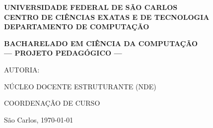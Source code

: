 \begin{titlepage}
\thispagestyle{empty}

\begin{center}

\begin{figure}[!ht]
    \hfill
  \end{figure}
  
   
    
   {\Large \textbf{UNIVERSIDADE FEDERAL DE SÃO CARLOS}} \\
   {\Large \textbf{CENTRO DE CIÊNCIAS EXATAS E DE TECNOLOGIA}} \\ 
   {\Large \textbf{DEPARTAMENTO DE COMPUTAÇÃO}}  \\ 
    \vspace{3cm}

	{\Large \textbf{BACHARELADO EM CIÊNCIA DA COMPUTAÇÃO}} \\
	\vspace{0.5cm} 
	{\Large\textbf{ --- PROJETO PEDAGÓGICO --- }} \\
	\vspace{7cm}    
    
\begin{onehalfspacing}
     {\large AUTORIA: \par} 
     {\large  NÚCLEO DOCENTE ESTRUTURANTE (NDE) \par}
     {\large COORDENAÇÃO DE CURSO \par} 

\end{onehalfspacing}
    \vspace{1cm}

    {\Large São Carlos, \today}

\end{center}
\clearpage

\end{titlepage}


